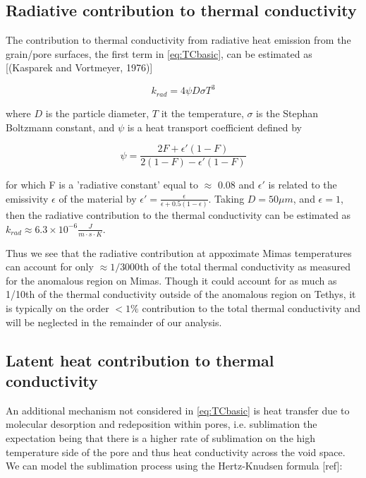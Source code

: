 \documentclass[11pt]{article} %
\begin{document}
\begin{itemize}

\subsection{Radiative contribution to thermal conductivity}

	The contribution to thermal conductivity from radiative heat emission from the grain/pore surfaces, the first term in \ref{eq:TCbasic}, can be estimated as [(Kasparek and Vortmeyer, 1976)]

	\begin{equation}
	k_{rad} = 4 \psi D \sigma T^{3}
	\end{equation}
	
	where $D$ is the particle diameter, $T$ it the temperature, $\sigma$ is the Stephan Boltzmann constant, and $\psi$ is a heat transport coefficient defined by
	
	\begin{equation}
	\psi = \frac{2F + \epsilon'(1-F)}{2(1-F)-\epsilon'(1-F)}
	\end{equation}

	for which F is a 'radiative constant' equal to $\approx$ 0.08 and $\epsilon'$ is related to the emissivity $\epsilon$ of the material by $\epsilon' = \frac{\epsilon}{\epsilon +0.5(1-\epsilon)}$. Taking $D = 50 \mu m$, and $\epsilon = 1$, then the radiative contribution to the thermal conductivity can be estimated as $k_{rad} \approx 6.3\times10^{-6} \frac{J}{m \cdot s \cdot K}$.
	
	Thus we see that the radiative contribution at appoximate Mimas temperatures can account for only $\approx 1/3000$th of the total thermal conductivity as measured for the anomalous region on Mimas. Though it could account for as much as 1/10th of the thermal conductivity outside of the anomalous region on Tethys, it is typically on the order $<1\%$ contribution to the total thermal conductivity and will be neglected in the remainder of our analysis.

\subsection{Latent heat contribution to thermal conductivity}
	An additional mechanism not considered in \ref{eq:TCbasic} is heat transfer due to molecular desorption and redeposition within pores, i.e. sublimation the expectation being that there is a higher rate of sublimation on the high temperature side of the pore and thus heat conductivity across the void space. We can model the sublimation process using the Hertz-Knudsen formula [ref]:


\end{itemize}
\end{document}
